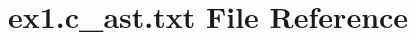 \hypertarget{ex1_8c__ast_8txt}{}\section{ex1.\+c\+\_\+ast.\+txt File Reference}
\label{ex1_8c__ast_8txt}
